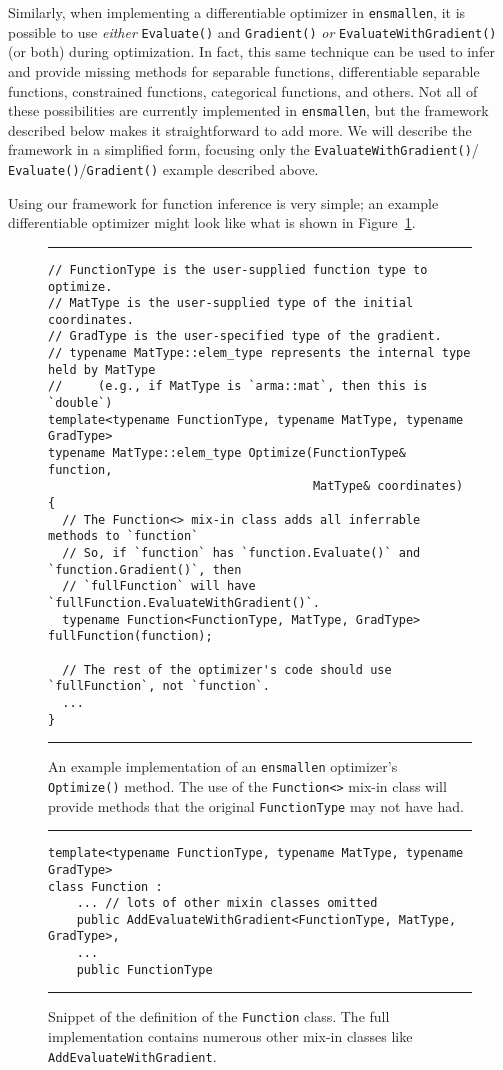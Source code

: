 Similarly, when implementing a differentiable optimizer in {\tt ensmallen}, it
is possible to use {\it either} {\tt Evaluate()} and {\tt Gradient()} {\it or}
{\tt EvaluateWithGradient()} (or both) during optimization.
In fact, this same technique can be used to infer and provide missing methods
for separable functions, differentiable separable functions, constrained
functions, categorical functions, and others.  Not all of these possibilities
are currently implemented in {\tt ensmallen}, but the framework described below
makes it straightforward to add more.  We will describe the framework in a
simplified form, focusing only the {\tt EvaluateWithGradient()}/{\tt
Evaluate()}/{\tt Gradient()} example described above.

Using our framework for function inference is very simple; an example
differentiable optimizer might look like what is shown in
Figure~\ref{fig:ex_optimize}.

\begin{figure}[t]
\hrule
\vspace{1ex}
\begin{verbatim}
// FunctionType is the user-supplied function type to optimize.
// MatType is the user-supplied type of the initial coordinates.
// GradType is the user-specified type of the gradient.
// typename MatType::elem_type represents the internal type held by MatType
//     (e.g., if MatType is `arma::mat`, then this is `double`)
template<typename FunctionType, typename MatType, typename GradType>
typename MatType::elem_type Optimize(FunctionType& function,
                                     MatType& coordinates)
{
  // The Function<> mix-in class adds all inferrable methods to `function`
  // So, if `function` has `function.Evaluate()` and `function.Gradient()`, then
  // `fullFunction` will have `fullFunction.EvaluateWithGradient()`.
  typename Function<FunctionType, MatType, GradType> fullFunction(function);

  // The rest of the optimizer's code should use `fullFunction`, not `function`.
  ...
}
\end{verbatim}
\hrule
\vspace*{-0.5em}
\caption{An example implementation of an {\tt ensmallen} optimizer's {\tt
Optimize()} method.  The use of the {\tt Function<>} mix-in class will provide
methods that the original {\tt FunctionType} may not have had.}
\label{fig:ex_optimize}
\end{figure}

\begin{figure}[t!]
\hrule
\vspace{1ex}
\begin{verbatim}
template<typename FunctionType, typename MatType, typename GradType>
class Function :
    ... // lots of other mixin classes omitted
    public AddEvaluateWithGradient<FunctionType, MatType, GradType>,
    ...
    public FunctionType
\end{verbatim}
\hrule
\vspace*{-0.5em}
\caption{Snippet of the definition of the {\tt Function} class.  The full
implementation contains numerous other mix-in classes like {\tt
AddEvaluateWithGradient}.}
\label{fig:function_snippet}
\end{figure}

